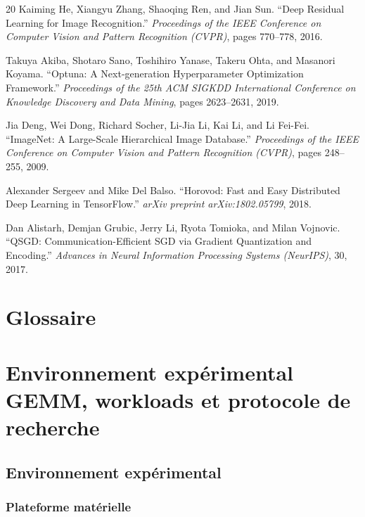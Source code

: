 \documentclass[a4paper,11pt,oneside]{article}
\begin{document}
\begin{thebibliography}{20}
Kaiming He, Xiangyu Zhang, Shaoqing Ren, and Jian Sun.
``Deep Residual Learning for Image Recognition.''
\textit{Proceedings of the IEEE Conference on Computer Vision and Pattern Recognition (CVPR)}, pages 770--778, 2016.

Takuya Akiba, Shotaro Sano, Toshihiro Yanase, Takeru Ohta, and Masanori Koyama.
``Optuna: A Next-generation Hyperparameter Optimization Framework.''
\textit{Proceedings of the 25th ACM SIGKDD International Conference on Knowledge Discovery and Data Mining}, pages 2623--2631, 2019.

Jia Deng, Wei Dong, Richard Socher, Li-Jia Li, Kai Li, and Li Fei-Fei.
``ImageNet: A Large-Scale Hierarchical Image Database.''
\textit{Proceedings of the IEEE Conference on Computer Vision and Pattern Recognition (CVPR)}, pages 248--255, 2009.

Alexander Sergeev and Mike Del Balso.
``Horovod: Fast and Easy Distributed Deep Learning in TensorFlow.''
\textit{arXiv preprint arXiv:1802.05799}, 2018.

Dan Alistarh, Demjan Grubic, Jerry Li, Ryota Tomioka, and Milan Vojnovic.
``QSGD: Communication-Efficient SGD via Gradient Quantization and Encoding.''
\textit{Advances in Neural Information Processing Systems (NeurIPS)}, 30, 2017.

\end{thebibliography}

\section*{Glossaire}

\appendix

\section{Environnement expérimental GEMM, workloads et protocole de recherche}\label{app:gemm_setup}

\subsection{Environnement expérimental}

\subsubsection{Plateforme matérielle}
\end{document}
